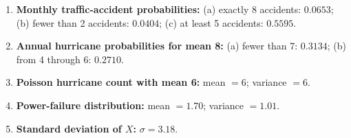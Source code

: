 \documentclass[11pt]{article}
\begin{document}
\begin{enumerate}[leftmargin=*,label=\textbf{\arabic*.}]
\item \textbf{Monthly traffic-accident probabilities:}
(a) exactly 8 accidents: $0.0653$;
(b) fewer than 2 accidents: $0.0404$;
(c) at least 5 accidents: $0.5595$.

\item \textbf{Annual hurricane probabilities for mean 8:}
(a) fewer than 7: $0.3134$;
(b) from 4 through 6: $0.2710$.

\item \textbf{Poisson hurricane count with mean 6:}
mean $=6$; variance $=6$.

\item \textbf{Power-failure distribution:}
mean $=1.70$; variance $=1.01$.

\item \textbf{Standard deviation of $X$:} $\sigma=3.18$.
\end{enumerate}
\end{document}
